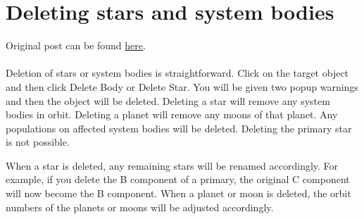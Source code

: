 \documentclass[../../Aurora C# unofficial manual.tex]{subfiles}
\begin{document}
	\section{Deleting stars and system bodies}\label{4_deleting_stars_and_bodies}
	Original post can be found
	\href{http://aurora2.pentarch.org/index.php?topic=8495.msg118745#msg118745}{here}.
	\\\\
	
	Deletion of stars or system bodies is straightforward. Click on the target object and then click Delete Body or Delete Star. You will be given two popup warnings and then the object will be deleted. Deleting a star will remove any system bodies in orbit. Deleting a planet will remove any moons of that planet. Any populations on affected system bodies will be deleted. Deleting the primary star is not possible.
	
	When a star is deleted, any remaining stars will be renamed accordingly. For example, if you delete the B component of a primary, the original C component will now become the B component. When a planet or moon is deleted, the orbit numbers of the planets or moons will be adjusted accordingly.
	
\end{document}
